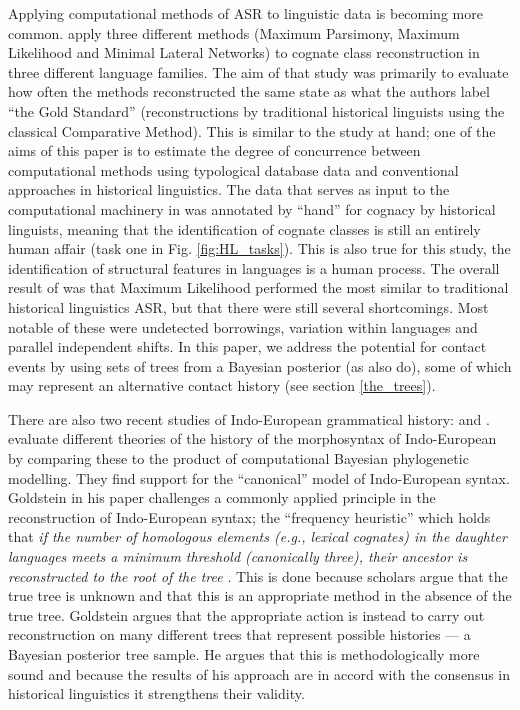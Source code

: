 \documentclass[12pt,letterpaper]{article}
\begin{document}

Applying computational methods of ASR to linguistic data is becoming more common. \citet{jager2018using} apply three different methods (Maximum Parsimony, Maximum Likelihood and Minimal Lateral Networks) to cognate class reconstruction in three different language families. The aim of that study was primarily to evaluate how often the methods reconstructed the same state as what the authors label ``the Gold Standard'' (reconstructions by traditional historical linguists using the classical Comparative Method). This is similar to the study at hand; one of the aims of this paper is to estimate the degree of concurrence between computational methods using typological database data and conventional approaches in historical linguistics. The data that serves as input to the computational machinery in \citet{jager2018using} was annotated by ``hand'' for cognacy by historical linguists, meaning that the identification of cognate classes is still an entirely human affair (task one in Fig. \ref{fig:HL_tasks}). This is also true for this study, the identification of structural features in languages is a human process. The overall result of \citet{jager2018using} was that Maximum Likelihood performed the most similar to traditional historical linguistics ASR, but that there were still several shortcomings. Most notable of these were undetected borrowings, variation within languages and parallel independent shifts. In this paper, we address the potential for contact events by using sets of trees from a Bayesian posterior (as \citet{jager2018using} also do), some of which may represent an alternative contact history (see section \ref{the_trees}). 

There are also two recent studies of Indo-European grammatical history: \citet{carling2021reconstructing} and \citet{goldstein_2022}. \citet{carling2021reconstructing} evaluate different theories of the history of the morphosyntax of Indo-European by comparing these to the product of computational Bayesian phylogenetic modelling. They find support for the ``canonical'' model of Indo-European syntax. Goldstein in his paper challenges a commonly applied principle in the reconstruction of Indo-European syntax; the ``frequency heuristic'' which holds that \emph{if the number of homologous elements (e.g., lexical cognates) in the daughter languages meets a minimum threshold (canonically three), their ancestor is reconstructed to the root of the tree} \citep[1/71]{goldstein_2022}. This is done because scholars argue that the true tree is unknown and that this is an appropriate method in the absence of the true tree. Goldstein argues that the appropriate action is instead to carry out reconstruction on many different trees that represent possible histories --- a Bayesian posterior tree sample. He argues that this is methodologically more sound and because the results of his approach are in accord with the consensus in historical linguistics it strengthens their validity.
\end{document}
